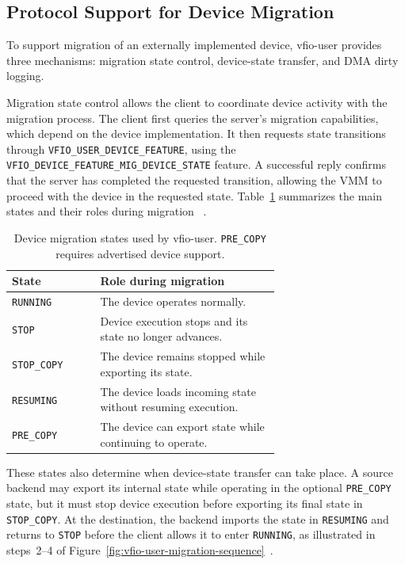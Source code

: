\subsection{Protocol Support for Device Migration}
\label{sec:state:vfio-user-migration}

To support migration of an externally implemented device, vfio-user provides 
three mechanisms: migration state control, device-state transfer, and DMA 
dirty logging.

Migration state control allows the client to coordinate device activity with 
the migration process. The client first queries the server's migration 
capabilities, which depend on the device implementation. It then requests 
state transitions through \texttt{VFIO\_USER\_DEVICE\_FEATURE}, using the 
\texttt{VFIO\_DEVICE\_FEATURE\_MIG\_DEVICE\_STATE} feature. A successful reply 
confirms that the server has completed the requested transition, allowing 
the VMM to proceed with the device in the requested state. Table~\ref{tab:vfio-user-migration-states} 
summarizes the main states and their roles during migration
~\cite{vfio-user-spec,linux-vfio-uapi}.

\begin{table}[htbp]
    \centering
    \begin{tabular}{@{}lp{0.67\linewidth}@{}}
        \toprule
        \textbf{State} & \textbf{Role during migration} \\
        \midrule
        \texttt{RUNNING} & The device operates normally. \\
        \texttt{STOP} & Device execution stops and its state no longer advances. \\
        \texttt{STOP\_COPY} & The device remains stopped while exporting its state. \\
        \texttt{RESUMING} & The device loads incoming state without resuming execution. \\
        \texttt{PRE\_COPY} & The device can export state while continuing to operate. \\
        \bottomrule
    \end{tabular}
    \caption[vfio-user device migration states]{Device migration states used
    by vfio-user. \texttt{PRE\_COPY} requires advertised device support.}
    \label{tab:vfio-user-migration-states}
\end{table}

These states also determine when device-state transfer can take place. A 
source backend may export its internal state while operating in the optional 
\texttt{PRE\_COPY} state, but it must stop device execution before exporting 
its final state in \texttt{STOP\_COPY}. At the destination, the backend imports 
the state in \texttt{RESUMING} and returns to \texttt{STOP} before the client 
allows it to enter \texttt{RUNNING}, as illustrated in steps~2--4 of
Figure~\ref{fig:vfio-user-migration-sequence}~\cite{linux-vfio-uapi}.

